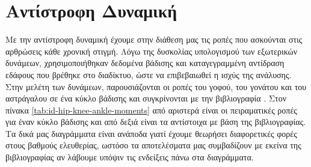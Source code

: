 \section{Αντίστροφη Δυναμική}

Με την αντίστροφη δυναμική έχουμε στην διάθεση μας τις ροπές που ασκούνται στις αρθρώσεις κάθε χρονική στιγμή. Λόγω της δυσκολίας υπολογισμού των εξωτερικών δυνάμεων, χρησιμοποιήθηκαν δεδομένα βάδισης και καταγεγραμμένη αντίδραση εδάφους που βρέθηκε στο διαδίκτυο, ώστε να επιβεβαιωθεί η ισχύς της ανάλυσης. Στην μελέτη των δυνάμεων, παρουσιάζονται οι ροπές του γοφού, του γονάτου και του αστράγαλου σε ένα κύκλο βάδισης και συγκρίνονται με την βιβλιογραφία \cite{whittlesey}. Στον πίνακα \ref{tab:id-hip-knee-ankle-moments} από αριστερά είναι οι πειραματικές ροπές για έναν κύκλο βάδισης και από δεξιά είναι τα αντίστοιχα με βάση της βιβλιογραφίας. Τα δικά μας διαγράμματα είναι ανάποδα γιατί έχουμε θεωρήσει διαφορετικές φορές στους βαθμούς ελευθερίας, ωστόσο τα αποτελέσματα μας συμβαδίζουν με εκείνα της βιβλιογραφίας αν λάβουμε υπόψιν τις ενδείξεις πάνω στα διαγράμματα.

